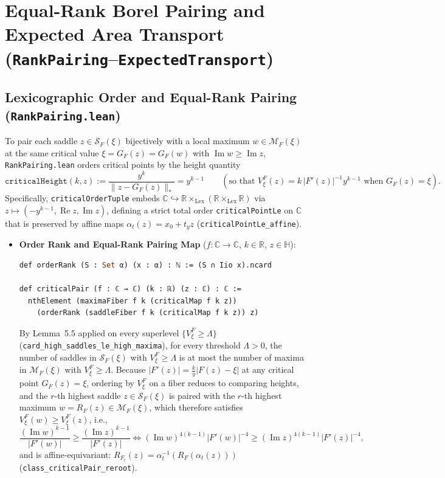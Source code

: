 \documentclass[11pt,reqno]{amsart}
\theoremstyle{definition}
\newcommand{\C}{\mathbb{C}}
\newcommand{\R}{\mathbb{R}}
\newcommand{\uhp}{\mathbb{H}}
\newcommand{\ImPart}{\operatorname{Im}}
\newcommand{\RePart}{\operatorname{Re}}
\begin{document}
\section{Equal-Rank Borel Pairing and Expected Area Transport (\texttt{RankPairing}--\texttt{ExpectedTransport})}

\subsection{Lexicographic Order and Equal-Rank Pairing (\texttt{RankPairing.lean})}

To pair each saddle $z \in \mathcal{S}_F(\xi)$ bijectively with a local maximum $w \in \mathcal{M}_F(\xi)$ at the same critical value $\xi = G_F(z) = G_F(w)$ with $\ImPart w \ge \ImPart z$, \texttt{RankPairing.lean} orders critical points by the height quantity
\[
\texttt{criticalHeight}(k, z) := \frac{y^k}{\|z - G_F(z)\|_*} = y^{k-1} \qquad (\text{so that } V_\xi^F(z) = k\,|F'(z)|^{-1} y^{k-1} \text{ when } G_F(z)=\xi).
\]
Specifically, \texttt{criticalOrderTuple} embeds $\C \hookrightarrow \R \times_{\text{Lex}} (\R \times_{\text{Lex}} \R)$ via $z \mapsto (-y^{k-1}, \RePart z, \ImPart z)$, defining a strict total order \texttt{criticalPointLe} on $\C$ that is preserved by affine maps $\alpha_t(z) = x_0 + t_y z$ (\texttt{criticalPointLe\_affine}).

\begin{itemize}
\item \textbf{Order Rank and Equal-Rank Pairing Map} ($f : \C \to \C$, $k \in \R$, $z \in \uhp$):
\begin{lstlisting}[language=Caml]
def orderRank (S : Set α) (x : α) : ℕ := (S ∩ Iio x).ncard

def criticalPair (f : ℂ → ℂ) (k : ℝ) (z : ℂ) : ℂ :=
  nthElement (maximaFiber f k (criticalMap f k z))
    (orderRank (saddleFiber f k (criticalMap f k z)) z)
\end{lstlisting}
By Lemma~5.5 applied on every superlevel $\{V_\xi^F \ge \Lambda\}$ (\texttt{card\_high\_saddles\_le\_high\_maxima}), for every threshold $\Lambda > 0$, the number of saddles in $\mathcal{S}_F(\xi)$ with $V_\xi^F \ge \Lambda$ is at most the number of maxima in $\mathcal{M}_F(\xi)$ with $V_\xi^F \ge \Lambda$. Because $|F'(z)| = \frac{k}{y}|F(z)-\xi|$ at any critical point $G_F(z)=\xi$, ordering by $V_\xi^F$ on a fiber reduces to comparing heights, and the $r$-th highest saddle $z \in \mathcal{S}_F(\xi)$ is paired with the $r$-th highest maximum $w = R_F(z) \in \mathcal{M}_F(\xi)$, which therefore satisfies $V_\xi^F(w) \ge V_\xi^F(z)$, i.e.,
\[
\frac{(\ImPart w)^{k-1}}{|F'(w)|} \ge \frac{(\ImPart z)^{k-1}}{|F'(z)|} \iff (\ImPart w)^{4(k-1)} |F'(w)|^{-4} \ge (\ImPart z)^{4(k-1)} |F'(z)|^{-4},
\]
and is affine-equivariant: $R_{F_t}(z) = \alpha_t^{-1}(R_F(\alpha_t(z)))$ (\texttt{class\_criticalPair\_reroot}).
\end{itemize}
\end{document}
